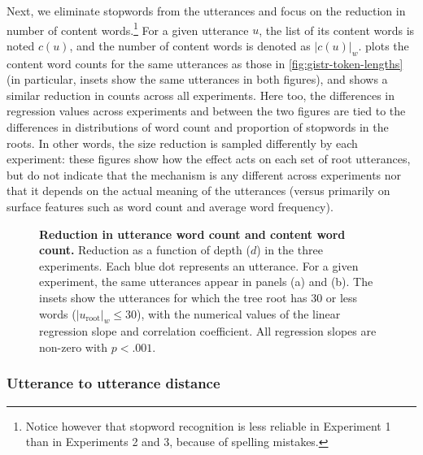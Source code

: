 Next, we eliminate stopwords from the utterances and focus on the
reduction in number of content words.\footnote{Notice however that stopword
recognition is less reliable in Experiment 1 than in Experiments 2 and
3, because of spelling mistakes.} For a given utterance \(u\), the list
of its content words is noted \(c(u)\), and the number of content words
is denoted as \(|c(u)|_w\).%
 plots the content word counts for the
same utterances as those in \cref{fig:gistr-token-lengths} (in
particular, insets show the same utterances in both figures), and shows
a similar reduction in counts across all experiments. Here too, the
differences in regression values across experiments and between the two
figures are tied to the differences in distributions of word count and
proportion of stopwords in the roots. In other words, the size reduction
is sampled differently by each experiment: these figures show how the
effect acts on each set of root utterances, but do not indicate that the
mechanism is any different across experiments nor that it depends on the
actual meaning of the utterances (versus primarily on surface features
such as word count and average word frequency).

\begin{figure}[!ht]
  \centering

  \caption[Reduction in utterance word count and content word count]{
  \textbf{Reduction in utterance word count and content word count.}
  Reduction as a function of depth ($d$) in the three experiments.
  Each blue dot represents an utterance.
  For a given experiment, the same utterances appear in panels (a) and (b).
  The insets show the utterances for which the tree root has 30 or less words ($|u_{\text{root}}|_w \leq 30$), with the numerical values of the linear regression slope and correlation coefficient.
  All regression slopes are non-zero with $p < .001$.
  }
  \label{fig:gistr-lengths}
\end{figure}

\subsubsection{Utterance to utterance
distance}\label{utterance-to-utterance-distance}

